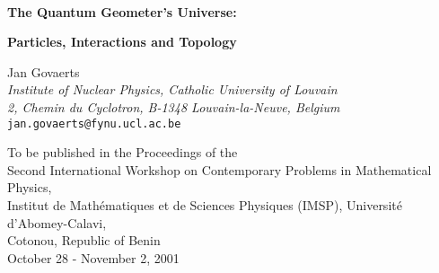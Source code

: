 \documentclass[a4paper,11pt]{article}
\begin{document}
%
\begin{titlepage}
\begin{centering}
 
{\ }\vspace{2cm}
 
{\Large\bf The Quantum Geometer's Universe:}

\vspace{5pt}

{\Large\bf Particles, Interactions and Topology}

\vspace{2cm}

Jan Govaerts\\
\vspace{1.0cm}
{\em Institute of Nuclear Physics, Catholic University of Louvain}\\
{\em 2, Chemin du Cyclotron, B-1348 Louvain-la-Neuve, Belgium}\\
{\tt jan.govaerts@fynu.ucl.ac.be}

\vspace{2cm}

\begin{abstract}

\noindent
With the two most profound conceptual revolutions of XX\coordHE{} century
physics, quantum mechanics and relativity, which have culminated
into relativistic spacetime geometry and quantum gauge field theory
as the principles for gravity and the three other known fundamental
interactions, the physicist of the XXI\coordHE{} century has inherited 
an unfinished symphony: the unification of the quantum and the
continuum. As an invitation to tomorrow's quantum geometers who
must design the new rulers by which to size up the Universe at those
scales where the smallest meets the largest, these lectures review the 
basic principles of today's conceptual framework, and highlight by way 
of simple examples the interplay that presently exists between the
quantum world of particle interactions and the classical world of
geometry and topology.

\end{abstract}

\vspace{35pt}
 
To be published in the Proceedings of the\\
Second International Workshop on Contemporary Problems in Mathematical
Physics,\\
Institut de Math\'ematiques et de Sciences Physiques (IMSP), Universit\'e
d'Abomey-Calavi,\\
Cotonou, Republic of Benin\\
October 28\coordHE{} - November 2\coordHE{}, 2001

\end{centering} 

\vspace{100pt}


\end{titlepage}
\end{document}

